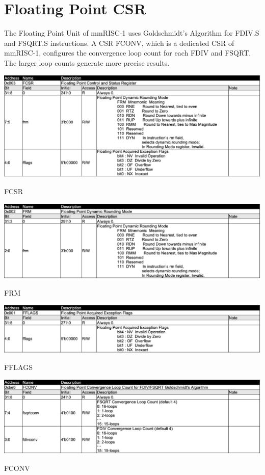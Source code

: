 \section{Floating Point CSR}

The Floating Point Unit of mmRISC-1 uses Goldschmidt's Algorithm for FDIV.S and FSQRT.S instructions. A CSR FCONV, which is a dedicated CSR of mmRISC-1, configures the convergence loop count for each FDIV and FSQRT. The larger loop counts generate more precise results.

\begin{table}[H]
    \includegraphics[width=1.00\columnwidth]{./Table/FCSR.png}
    \caption{FCSR}
    \label{tb:FCSR}
\end{table}

\begin{table}[H]
    \includegraphics[width=1.00\columnwidth]{./Table/FRM.png}
    \caption{FRM}
    \label{tb:FRM}
\end{table}

\begin{table}[H]
    \includegraphics[width=1.00\columnwidth]{./Table/FFLAGS.png}
    \caption{FFLAGS}
    \label{tb:FFLAGS}
\end{table}

\begin{table}[H]
    \includegraphics[width=1.00\columnwidth]{./Table/FCONV.png}
    \caption{FCONV}
    \label{tb:FCONV}
\end{table}

